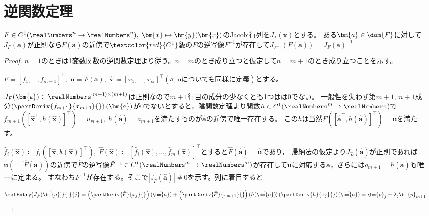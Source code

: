     \section{逆関数定理}
        \begin{shadebox}
            $F\in C^1(\realNumbers^n\to\realNumbers^n),\;\bm{x}\mapsto\bm{y}(\bm{x})$のJacobi行列を$J_F(\bm{x})$とする。
            ある$\bm{a}\in\dom{F}$に対して$J_F(\bm{a})$が正則なら$F(\bm{a})$の近傍で$\textcolor{red}{C^1}$級の$F$の逆写像$F^{-1}$が存在して$J_{F^{-1}}(F(\bm{a})) = J_F(\bm{a})^{-1}$
        \end{shadebox}
        \newcommand{\xhat}{\hat{\bm{x}}}
        \newcommand{\ahat}{\hat{\bm{a}}}
        \newcommand{\uhat}{\hat{\bm{u}}}
        \newcommand{\fhat}{\hat{f}}
        \newcommand{\Fhat}{\hat{F}}
        \begin{proof}
            \quad\par
            $n=1$のときは1変数関数の逆関数定理より従う。$n=m$のとき成り立つと仮定して$n=m+1$のとき成り立つことを示す。
            \par
            $F = [f_1,\dotsc,f_{m+1}]^\top,\;\bm{u}=F(\bm{a}),\;\xhat \coloneq [x_1,\dotsc,x_m]^\top(\bm{a},\bm{u}\text{についても同様に定義})$とする。
            \par
            $J_F(\bm{a})\in\realNumbers^{(m+1)\times(m+1)}$は正則なので$m+1$行目の成分の少なくとも1つはは0でない。
            一般性を失わず第$m+1,m+1$成分$\left(\partDeriv{f_{m+1}}{x_{m+1}}{}\right)(\bm{a})$が0でないとすると，陰関数定理より関数$h\in C^1(\realNumbers^m\to\realNumbers$)で$f_{m+1}([\xhat^\top,h(\xhat)]^\top) = u_{m+1},\;h(\ahat) = a_{m+1}$を満たすものが$\ahat$の近傍で唯一存在する。
            この$h$は当然$F([\ahat^\top,h(\ahat)]^\top) = \bm{u}$を満たす。
            \par
            $\fhat_i(\xhat) \coloneq f_i([\xhat,h(\xhat)]^\top),\;\Fhat(\xhat) \coloneq [\fhat_i(\xhat),\dotsc,\fhat_m(\xhat)]^\top$とすると$\Fhat(\ahat) = \uhat$であり，
            帰納法の仮定より$J_{\Fhat}(\ahat)$が正則であれば$\uhat(=\Fhat(\ahat))$の近傍で$\Fhat$の逆写像$\Fhat^{-1}\in C^1(\realNumbers^m\to\realNumbers^m)$が存在して$\uhat$に対応する$\ahat$，さらには$a_{m+1}=h(\ahat)$も唯一に定まる。
            すなわち$F^{-1}$が存在する。そこで$|J_{\Fhat}(\ahat)|\neq 0$を示す。列に着目すると
            \par
            \[ \matEntry{J_{\Fhat}(\ahat)}{:}{j} = \left(\partDeriv{\Fhat}{x_j}{}\right)(\ahat) + \left(\partDeriv{\Fhat}{x_{m+1}}{}\right)(h(\ahat))\left(\partDeriv{h}{x_j}{}\right)(\ahat) = \bm{p}_j + \lambda_j\bm{p}_{m+1} \]

\end{proof}
